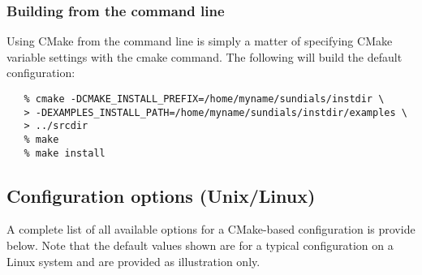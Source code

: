 

 
\subsubsection*{Building from the command line}

Using CMake from the command line is simply a matter of specifying CMake variable settings
with the {\id cmake} command.  The following will build the default configuration:  

\begin{verbatim}
   % cmake -DCMAKE_INSTALL_PREFIX=/home/myname/sundials/instdir \
   > -DEXAMPLES_INSTALL_PATH=/home/myname/sundials/instdir/examples \
   > ../srcdir
   % make
   % make install
\end{verbatim}


\subsection{Configuration options (Unix/Linux)}\label{ss:configuration_options_nix}

A complete list of all available options for a CMake-based {\sundials}
configuration is provide below. Note that the default values shown are for 
a typical configuration on a Linux system and are provided as illustration only.

